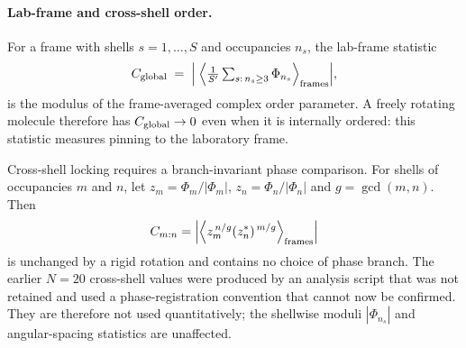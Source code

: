\paragraph{Lab-frame and cross-shell order.}
For a frame with shells $s=1,\dots,S$ and occupancies $n_s$, the lab-frame statistic
\begin{equation}
  C_{\rm global} \;=\; \Big|\;\Big\langle \tfrac{1}{S'}\textstyle\sum_{s:\,n_s\ge3}
  \Phi_{n_s}\Big\rangle_{\rm frames}\Big| ,
  \label{eq:Cglobal}
\end{equation}
is the modulus of the frame-averaged complex order parameter. A freely rotating molecule
therefore has $C_{\rm global}\to0$ even when it is internally ordered: this statistic measures
pinning to the laboratory frame.

Cross-shell locking requires a branch-invariant phase comparison. For shells of occupancies
$m$ and $n$, let $z_m=\Phi_m/|\Phi_m|$, $z_n=\Phi_n/|\Phi_n|$ and
$g=\gcd(m,n)$. Then
\begin{equation}
  C_{m:n}=\left|\left\langle z_m^{\,n/g}(z_n^*)^{\,m/g}\right\rangle_{\rm frames}\right|
  \label{eq:Ctilde}
\end{equation}
is unchanged by a rigid rotation and contains no choice of phase branch. The earlier
$N{=}20$ cross-shell values were produced by an analysis script that was not retained and
used a phase-registration convention that cannot now be confirmed. They are therefore not
used quantitatively; the shellwise moduli $|\Phi_{n_s}|$ and angular-spacing statistics are
unaffected.

